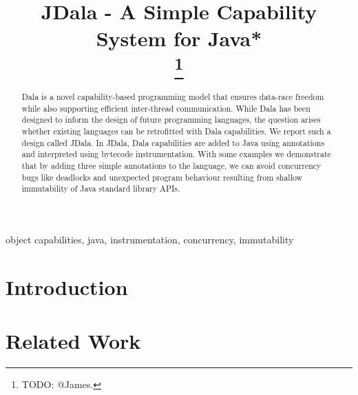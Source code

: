 \documentclass[conference]{IEEEtran}
\newcommand{\dala}{Dala\xspace}
\newcommand{\jdala}{JDala\xspace}
\begin{document}
	
	

\title{JDala - A Simple Capability System for Java*\\
\thanks{TODO: @James.}
}

\author{
}


\maketitle

\begin{abstract}


\dala is a novel capability-based programming model that ensures data-race freedom while also supporting efficient inter-thread communication. While \dala has been designed to inform the design of future programming languages, the question arises whether existing languages can be retrofitted with \dala capabilities. We report such a design called \jdala. In \jdala,  \dala capabilities are added to Java using annotations and interpreted using bytecode instrumentation. With some examples we demonstrate that by adding three simple annotations to the language, we can avoid concurrency bugs like deadlocks and unexpected program behaviour resulting from shallow immutability of Java standard library APIs. 

\end{abstract}

\begin{IEEEkeywords}
object capabilities, java, instrumentation, concurrency, immutability 
\end{IEEEkeywords}

\section{Introduction}



\section{Related Work}
\end{document}
